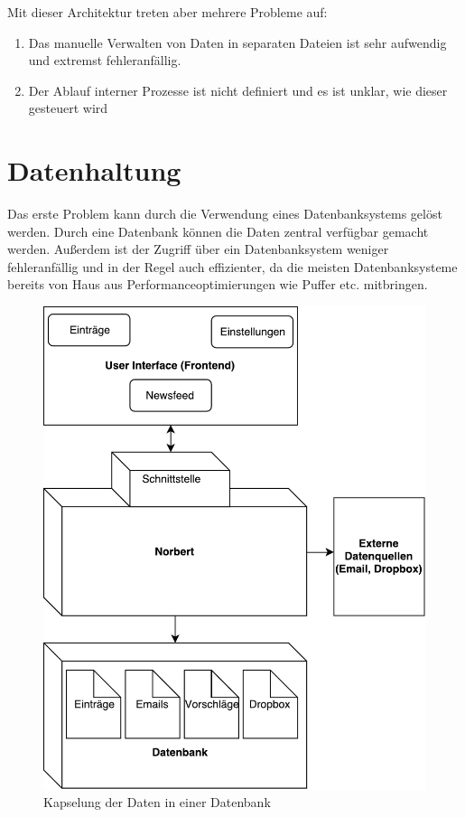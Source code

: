 Mit dieser Architektur treten aber mehrere Probleme auf:
  	\begin{enumerate}
  	\item Das manuelle Verwalten von Daten in separaten Dateien ist sehr aufwendig und extremst fehleranfällig.
  	\item Der Ablauf interner Prozesse ist nicht definiert und es ist unklar, wie dieser gesteuert wird
  	\end{enumerate}

\section{Datenhaltung}

Das erste Problem kann durch die Verwendung eines Datenbanksystems gelöst werden. Durch eine Datenbank können die Daten zentral verfügbar gemacht werden. Außerdem ist der Zugriff über ein Datenbanksystem weniger fehleranfällig und in der Regel auch effizienter, da die meisten Datenbanksysteme bereits von Haus aus Performanceoptimierungen wie Puffer etc. mitbringen. 
\begin{figure}[H]
\centering
\includegraphics[scale=0.75]{uml-diagramms/daten_hlvl.pdf}
\caption{Kapselung der Daten in einer Datenbank}
\label{fig: DB_HLVL}
\end{figure}

